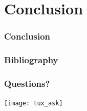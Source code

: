 \documentclass[10pt, svgnames, compress, red]{beamer}
\begin{document}
\section{Conclusion}
\begin{frame}
  \frametitle{Conclusion}

  \transdissolve[duration=0.1]
\end{frame}


\begin{frame}[allowframebreaks]
  \frametitle{Bibliography}
  \nocite{*}
  
  \transdissolve[duration=0.1]
\end{frame}


\begin{frame}
  \frametitle{Questions?}

  \begin{center}
    \texttt{[image: tux\_ask]}
  \end{center}
  \transdissolve[duration=0.1]
\end{frame}
\end{document}
